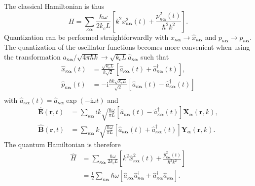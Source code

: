 \documentclass{article}
\numberwithin{equation}{section}
\begin{document}
The classical Hamiltonian is thus
\begin{equation}
H = \sum_{\kappa\bm{\alpha}}\frac{\hbar\omega}{2k_cL}\left[k^2x_{\kappa\bm{\alpha}}^2(t) + \frac{p_{\kappa\bm{\alpha}}^2(t)}{\hbar^2k^2}\right].
\end{equation}
Quantization can be performed straightforwardly with $x_{\kappa\bm{\alpha}}\to\hat{x}_{\kappa\bm{\alpha}}$ and $p_{\kappa\bm{\alpha}}\to\hat{p}_{\kappa\bm{\alpha}}$. The quantization of the oscillator functions becomes more convenient when using the transformation $a_{\kappa\bm{\alpha}}/\sqrt{4\pi\hbar k}\to\sqrt{k_cL}\hat{a}_{\kappa\bm{\alpha}}$ such that
\begin{equation}\label{eq:xAndP3}
\begin{split}
\hat{x}_{\kappa\bm{\alpha}}(t) &= \frac{\sqrt{k_cL}}{k\sqrt{2}}\left[\hat{a}_{\kappa\bm{\alpha}}(t) + \hat{a}_{\kappa\bm{\alpha}}^\dagger(t)\right],\\
\hat{p}_{\kappa\bm{\alpha}}(t) &= -\mathrm{i}\frac{\hbar k\sqrt{k_cL}}{\sqrt{2}}\left[\hat{a}_{\kappa\bm{\alpha}}(t) - \hat{a}_{\kappa\bm{\alpha}}^\dagger(t)\right]\\
\end{split}
\end{equation}
with $\hat{a}_{\kappa\bm{\alpha}}(t) = \hat{a}_{\kappa\bm{\alpha}}\exp(-\mathrm{i}\omega t)$ and
\begin{equation}
\begin{split}
\hat{\mathbf{E}}(\mathbf{r},t) &= \sum_{\kappa\bm{\alpha}}\mathrm{i}k\sqrt{\frac{\hbar\omega}{\pi L}}\left[\hat{a}_{\kappa\bm{\alpha}}(t) - \hat{a}^\dagger_{\kappa\bm{\alpha}}(t)\right]\mathbf{X}_{\bm{\alpha}}(\mathbf{r},k),\\
\hat{\mathbf{B}}(\mathbf{r},t) &= \sum_{\kappa\bm{\alpha}}k\sqrt{\frac{\hbar\omega}{\pi L}}\left[\hat{a}_{\kappa\bm{\alpha}}(t) + \hat{a}^\dagger_{\kappa\bm{\alpha}}(t)\right]\mathbf{Y}_{\bm{\alpha}}(\mathbf{r},k).
\end{split}
\end{equation}
The quantum Hamiltonian is therefore
\begin{equation}
\begin{split}
\hat{H} &= \sum_{\kappa\bm{\alpha}}\frac{\hbar\omega}{2k_cL}\left[k^2\hat{x}_{\kappa\bm{\alpha}}^2(t) + \frac{\hat{p}_{\kappa\bm{\alpha}}^2(t)}{\hbar^2k^2}\right]\\
&= \frac{1}{2}\sum_{\kappa\bm{\alpha}}\hbar\omega\left[\hat{a}_{\kappa\bm{\alpha}}\hat{a}^\dagger_{\kappa\bm{\alpha}} + \hat{a}^\dagger_{\kappa\bm{\alpha}}\hat{a}_{\kappa\bm{\alpha}}\right].
\end{split}
\end{equation}
\end{document}
